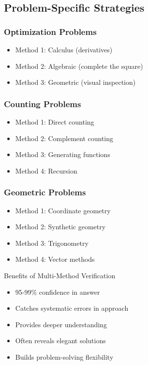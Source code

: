 \documentclass{article}
\begin{document}
\subsection{Problem-Specific Strategies}

\subsubsection{Optimization Problems}
\begin{itemize}
\item Method 1: Calculus (derivatives)
\item Method 2: Algebraic (complete the square)
\item Method 3: Geometric (visual inspection)
\end{itemize}

\subsubsection{Counting Problems}
\begin{itemize}
\item Method 1: Direct counting
\item Method 2: Complement counting
\item Method 3: Generating functions
\item Method 4: Recursion
\end{itemize}

\subsubsection{Geometric Problems}
\begin{itemize}
\item Method 1: Coordinate geometry
\item Method 2: Synthetic geometry
\item Method 3: Trigonometry
\item Method 4: Vector methods
\end{itemize}

\begin{successbox}{Benefits of Multi-Method Verification}
\begin{itemize}[nosep]
\item 95-99\% confidence in answer
\item Catches systematic errors in approach
\item Provides deeper understanding
\item Often reveals elegant solutions
\item Builds problem-solving flexibility
\end{itemize}
\end{successbox}
\end{document}
